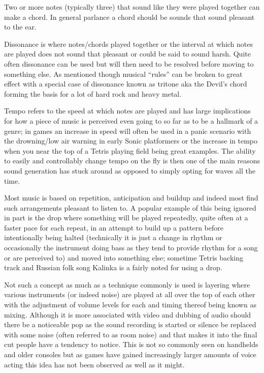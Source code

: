 \documentclass[
]{book}
\begin{document}
Two or more notes (typically three) that sound like they were played together can make a chord. In general parlance a chord should be sounds that sound pleasant to the ear.

Dissonance is where notes/chords played together or the interval at which notes are played does not sound that pleasant or could be said to sound harsh. Quite often dissonance can be used but will then need to be resolved before moving to something else. As mentioned though musical ``rules'' can be broken to great effect with a special case of dissonance known as tritone aka the Devil's chord forming the basis for a lot of hard rock and heavy metal.

Tempo refers to the speed at which notes are played and has large implications for how a piece of music is perceived even going to so far as to be a hallmark of a genre; in games an increase in speed will often be used in a panic scenario with the drowning/low air warning in early Sonic platformers or the increase in tempo when you near the top of a Tetris playing field being great examples. The ability to easily and controllably change tempo on the fly is then one of the main reasons sound generation has stuck around as opposed to simply opting for waves all the time.

Most music is based on repetition, anticipation and buildup and indeed most find such arrangements pleasant to listen to. A popular example of this being ignored in part is the drop where something will be played repeatedly, quite often at a faster pace for each repeat, in an attempt to build up a pattern before intentionally being halted (technically it is just a change in rhythm or occasionally the instrument doing bass as they tend to provide rhythm for a song or are perceived to) and moved into something else; sometime Tetris backing track and Russian folk song Kalinka is a fairly noted for using a drop.

Not such a concept as much as a technique commonly is used is layering where various instruments (or indeed noise) are played at all over the top of each other with the adjustment of volume levels for each and timing thereof being known as mixing. Although it is more associated with video and dubbing of audio should there be a noticeable pop as the sound recording is started or silence be replaced with some noise (often referred to as room noise) and that makes it into the final cut people have a tendency to notice. This is not so commonly seen on handhelds and older consoles but as games have gained increasingly larger amounts of voice acting this idea has not been observed as well as it might.
\end{document}
